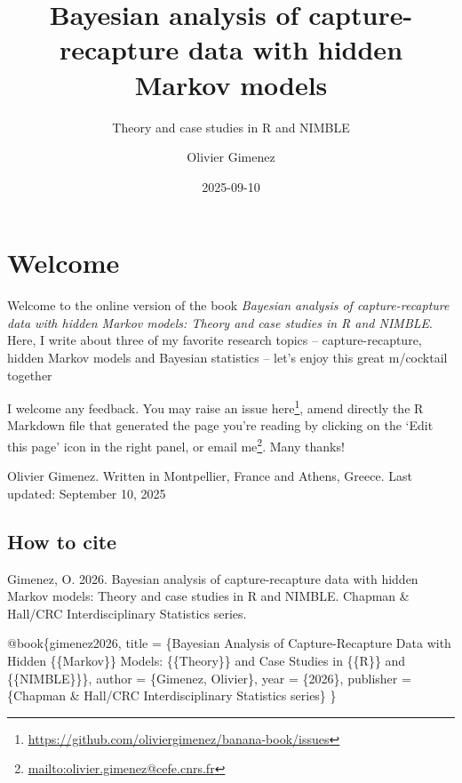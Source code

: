 \documentclass[
  12pt,
]{krantz}
\title{Bayesian analysis of capture-recapture data with hidden Markov models}
\subtitle{Theory and case studies in R and NIMBLE}
\author{Olivier Gimenez}
\date{2025-09-10}
\newenvironment{Shaded}{\begin{snugshade}}{\end{snugshade}}
\newcommand{\DataTypeTok}[1]{\textcolor[rgb]{0.13,0.29,0.53}{#1}}
\newcommand{\NormalTok}[1]{#1}
\newcommand{\OtherTok}[1]{\textcolor[rgb]{0.56,0.35,0.01}{#1}}
\newcommand{\VariableTok}[1]{\textcolor[rgb]{0.00,0.00,0.00}{#1}}
\renewcommand{\href}[2]{#2\footnote{\url{#1}}}
\begin{document}
\maketitle

\thispagestyle{empty}

\setlength{\abovedisplayskip}{-5pt}
\setlength{\abovedisplayshortskip}{-5pt}

{
\hypersetup{linkcolor=}
\setcounter{tocdepth}{2}
\tableofcontents
}
\listoffigures
\listoftables
\chapter*{Welcome}\label{welcome}


Welcome to the online version of the book \emph{Bayesian analysis of capture-recapture data with hidden Markov models: Theory and case studies in R and NIMBLE}. Here, I write about three of my favorite research topics -- capture-recapture, hidden Markov models and Bayesian statistics -- let's enjoy this great m/cocktail together 🍹

I welcome any feedback. You may raise an issue \href{https://github.com/oliviergimenez/banana-book/issues}{here}, amend directly the R Markdown file that generated the page you're reading by clicking on the `Edit this page' icon in the right panel, or \href{mailto:olivier.gimenez@cefe.cnrs.fr}{email me}. Many thanks!

Olivier Gimenez. Written in Montpellier, France and Athens, Greece.
Last updated: September 10, 2025

\section*{How to cite}\label{how-to-cite}


Gimenez, O. 2026. Bayesian analysis of capture-recapture data with hidden Markov models: Theory and case studies in R and NIMBLE. Chapman \& Hall/CRC Interdisciplinary Statistics series.

\begin{Shaded}
\begin{Highlighting}[]
\VariableTok{@book}\NormalTok{\{}\OtherTok{gimenez2026}\NormalTok{,}
  \DataTypeTok{title}\NormalTok{ = \{Bayesian Analysis of Capture{-}Recapture Data with Hidden \{\{Markov\}\} Models: \{\{Theory\}\} and Case Studies in \{\{R\}\} and \{\{NIMBLE\}\}\},}
  \DataTypeTok{author}\NormalTok{ = \{Gimenez, Olivier\},}
  \DataTypeTok{year}\NormalTok{ = \{2026\},}
  \DataTypeTok{publisher}\NormalTok{ = \{Chapman \& Hall/CRC Interdisciplinary Statistics series\}}
\NormalTok{\}}
\end{Highlighting}
\end{Shaded}
\end{document}
